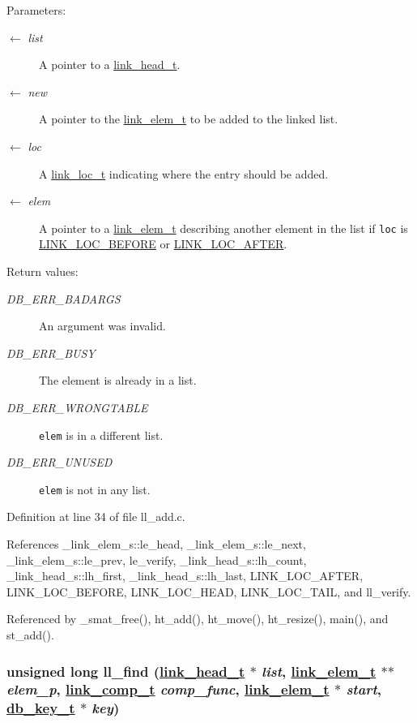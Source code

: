 \begin{Desc}
\item[Parameters:]
\begin{description}
\item[\mbox{$\leftarrow$} {\em list}]A pointer to a \hyperlink{group__dbprim__link_ga0}{link\_\-head\_\-t}. \item[\mbox{$\leftarrow$} {\em new}]A pointer to the \hyperlink{group__dbprim__link_ga1}{link\_\-elem\_\-t} to be added to the linked list. \item[\mbox{$\leftarrow$} {\em loc}]A \hyperlink{group__dbprim__link_ga4}{link\_\-loc\_\-t} indicating where the entry should be added. \item[\mbox{$\leftarrow$} {\em elem}]A pointer to a \hyperlink{group__dbprim__link_ga1}{link\_\-elem\_\-t} describing another element in the list if {\tt loc} is \hyperlink{group__dbprim__link_gga28a135}{LINK\_\-LOC\_\-BEFORE} or \hyperlink{group__dbprim__link_gga28a136}{LINK\_\-LOC\_\-AFTER}.\end{description}
\end{Desc}
\begin{Desc}
\item[Return values:]
\begin{description}
\item[{\em DB\_\-ERR\_\-BADARGS}]An argument was invalid. \item[{\em DB\_\-ERR\_\-BUSY}]The element is already in a list. \item[{\em DB\_\-ERR\_\-WRONGTABLE}]{\tt elem} is in a different list. \item[{\em DB\_\-ERR\_\-UNUSED}]{\tt elem} is not in any list.\end{description}
\end{Desc}


Definition at line 34 of file ll\_\-add.c.

References \_\-link\_\-elem\_\-s::le\_\-head, \_\-link\_\-elem\_\-s::le\_\-next, \_\-link\_\-elem\_\-s::le\_\-prev, le\_\-verify, \_\-link\_\-head\_\-s::lh\_\-count, \_\-link\_\-head\_\-s::lh\_\-first, \_\-link\_\-head\_\-s::lh\_\-last, LINK\_\-LOC\_\-AFTER, LINK\_\-LOC\_\-BEFORE, LINK\_\-LOC\_\-HEAD, LINK\_\-LOC\_\-TAIL, and ll\_\-verify.

Referenced by \_\-smat\_\-free(), ht\_\-add(), ht\_\-move(), ht\_\-resize(), main(), and st\_\-add().\hypertarget{group__dbprim__link_ga9}{
\subsubsection[ll\_\-find]{\setlength{\rightskip}{0pt plus 5cm}unsigned long ll\_\-find (\hyperlink{struct__link__head__s}{link\_\-head\_\-t} $\ast$ {\em list}, \hyperlink{struct__link__elem__s}{link\_\-elem\_\-t} $\ast$$\ast$ {\em elem\_\-p}, \hyperlink{group__dbprim__link_ga3}{link\_\-comp\_\-t} {\em comp\_\-func}, \hyperlink{struct__link__elem__s}{link\_\-elem\_\-t} $\ast$ {\em start}, \hyperlink{struct__db__key__s}{db\_\-key\_\-t} $\ast$ {\em key})}}
\label{group__dbprim__link_ga9}


